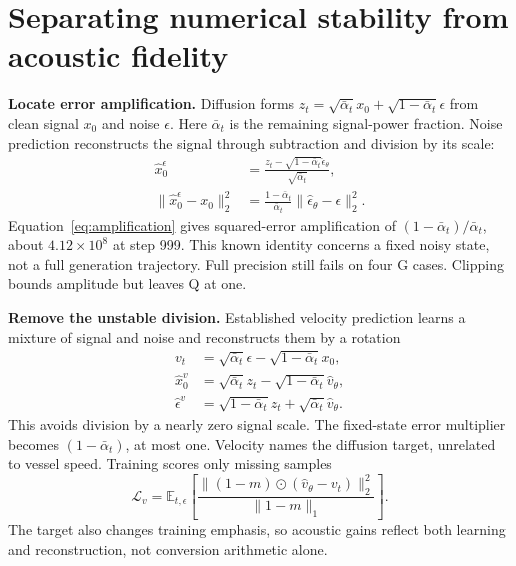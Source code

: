 \documentclass[runningheads,orivec]{llncs}
\begin{document}
\section{Separating numerical stability from acoustic fidelity}
\label{sec:correction}

\textbf{Locate error amplification.} Diffusion forms $z_t=\sqrt{\bar\alpha_t}x_0+\sqrt{1-\bar\alpha_t}\epsilon$ from clean signal $x_0$ and noise $\epsilon$. Here $\bar\alpha_t$ is the remaining signal-power fraction. Noise prediction reconstructs the signal through subtraction and division by its scale:
\begin{equation}
\begin{aligned}
\hat x_0^{\epsilon}&=\frac{z_t-\sqrt{1-\bar\alpha_t}\hat\epsilon_\theta}{\sqrt{\bar\alpha_t}},\\
\|\hat x_0^{\epsilon}-x_0\|_2^2&=\frac{1-\bar\alpha_t}{\bar\alpha_t}\|\hat\epsilon_\theta-\epsilon\|_2^2.
\end{aligned}\label{eq:amplification}
\end{equation}
Equation~\ref{eq:amplification} gives squared-error amplification of $(1-\bar\alpha_t)/\bar\alpha_t$, about $4.12\times10^8$ at step 999. This known identity concerns a fixed noisy state, not a full generation trajectory. Full precision still fails on four G cases. Clipping bounds amplitude but leaves Q at one.

\textbf{Remove the unstable division.} Established velocity prediction \cite{salimans} learns a mixture of signal and noise and reconstructs them by a rotation
\begin{equation}
\begin{aligned}
v_t&=\sqrt{\bar\alpha_t}\epsilon-\sqrt{1-\bar\alpha_t}x_0,\\
\hat x_0^{v}&=\sqrt{\bar\alpha_t}z_t-\sqrt{1-\bar\alpha_t}\hat v_\theta,\\
\hat\epsilon^{v}&=\sqrt{1-\bar\alpha_t}z_t+\sqrt{\bar\alpha_t}\hat v_\theta.
\end{aligned}\label{eq:velocity}
\end{equation}
This avoids division by a nearly zero signal scale. The fixed-state error multiplier becomes $(1-\bar\alpha_t)$, at most one. Velocity names the diffusion target, unrelated to vessel speed. Training scores only missing samples
\begin{equation}
\mathcal L_v=\mathbb E_{t,\epsilon}\!\left[
\frac{\|(1-m)\odot(\hat v_\theta-v_t)\|_2^2}{\|1-m\|_1}
\right].\label{eq:velocity_loss}
\end{equation}
The target also changes training emphasis, so acoustic gains reflect both learning and reconstruction, not conversion arithmetic alone.
\end{document}
